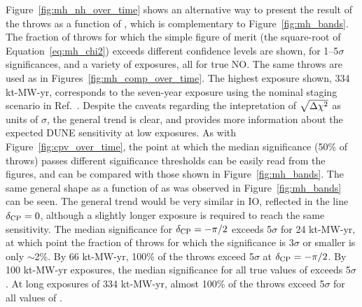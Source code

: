 Figure~\ref{fig:mh_nh_over_time} shows an alternative way to present the result of the throws as a function of \deltacp, which is complementary to Figure~\ref{fig:mh_bands}. The fraction of throws for which the simple figure of merit (the square-root of Equation~\ref{eq:mh_chi2}) exceeds different confidence levels are shown, for 1--5$\sigma$ significances, and a variety of exposures, all for true NO. The same throws are used as in Figures~\ref{fig:mh_comp_over_time}. The highest exposure shown, 334 kt-MW-yr, corresponds to the seven-year exposure using the nominal staging scenario in Ref.~\cite{Abi:2020qib}. Despite the caveats regarding the intepretation of $\sqrt{\Delta\chi^{2}}$ as units of $\sigma$, the general trend is clear, and provides more information about the expected DUNE sensitivity at low exposures. As with Figure~\ref{fig:cpv_over_time}, the point at which the median significance (50\% of throws) passes different significance thresholds can be easily read from the figures, and can be compared with those shown in Figure~\ref{fig:mh_bands}. The same general shape as a function of \deltacp as was observed in Figure~\ref{fig:mh_bands} can be seen. The general trend would be very similar in IO, reflected in the line $\delta_{\rm CP} = 0$, although a slightly longer exposure is required to reach the same sensitivity. The median significance for $\delta_{\rm CP} = -\pi/2$ exceeds 5$\sigma$ for 24 kt-MW-yr, at which point the fraction of throws for which the significance is 3$\sigma$ or smaller is only $\sim$2\%. By 66 kt-MW-yr, 100\% of the throws exceed 5$\sigma$ at $\delta_{\rm CP} = -\pi/2$. By 100 kt-MW-yr exposures, the median significance for all true values of \deltacp exceeds 5$\sigma$. At long exposures of 334 kt-MW-yr, almost 100\% of the throws exceed 5$\sigma$ for all values of \deltacp.
